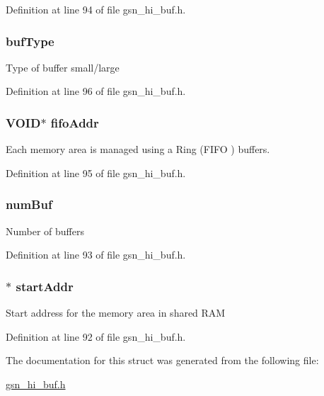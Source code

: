 Definition at line 94 of file gsn\_\-hi\_\-buf.h.

\hypertarget{a00090_ae00cc8d105d4e28276994f76c089fe90}{
\subsubsection[{bufType}]{ {\bf bufType}}}
\label{a00090_ae00cc8d105d4e28276994f76c089fe90}
Type of buffer small/large 

Definition at line 96 of file gsn\_\-hi\_\-buf.h.

\hypertarget{a00090_a9f6314cb2838f0d2e9ac11e3fac3c0b1}{
\subsubsection[{fifoAddr}]{\setlength{\rightskip}{0pt plus 5cm}VOID$\ast$ {\bf fifoAddr}}}
\label{a00090_a9f6314cb2838f0d2e9ac11e3fac3c0b1}
Each memory area is managed using a Ring (FIFO ) buffers. 

Definition at line 95 of file gsn\_\-hi\_\-buf.h.

\hypertarget{a00090_a91f4e355e149035efd46658e1b515cea}{
\subsubsection[{numBuf}]{ {\bf numBuf}}}
\label{a00090_a91f4e355e149035efd46658e1b515cea}
Number of buffers 

Definition at line 93 of file gsn\_\-hi\_\-buf.h.

\hypertarget{a00090_a4470f0ec066927d0919c2a5e47a5fa88}{
\subsubsection[{startAddr}]{$\ast$ {\bf startAddr}}}
\label{a00090_a4470f0ec066927d0919c2a5e47a5fa88}
Start address for the memory area in shared RAM 

Definition at line 92 of file gsn\_\-hi\_\-buf.h.



The documentation for this struct was generated from the following file:\begin{DoxyCompactItemize}
\item 
\hyperlink{a00505}{gsn\_\-hi\_\-buf.h}\end{DoxyCompactItemize}

